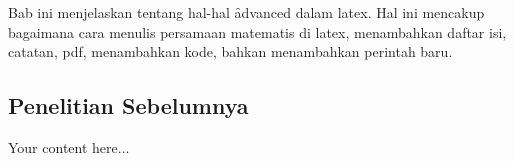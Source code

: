 \chapter{\babTiga}
\label{bab:3}
Bab ini menjelaskan tentang hal-hal \f{advanced} dalam \gls{latex}.
Hal ini mencakup bagaimana cara menulis persamaan matematis di \gls{latex}, menambahkan daftar isi, catatan, \acrshort{pdf}, menambahkan kode, bahkan menambahkan perintah baru.



\clearpage

\begin{landscape}

\thispagestyle{landscape}

\section{Penelitian Sebelumnya}
\label{sec:2_3}

Your content here...

\end{landscape}

\clearpage

